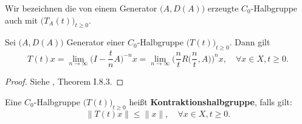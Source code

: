 \begin{verein}
Wir bezeichnen die  von einem Generator $\big(A, D(A)\big)$ erzeugte $C_0$-Halbgruppe auch mit $\big(T_A(t)\big)_{t\geq0}$.
\end{verein}


\begin{satz}\label{Darstellung einer Halbgruppe mithilfe der Resolvente}
Sei $\big(A, D(A)\big)$ Generator einer $C_0$-Halbgruppe  $\big(T(t)\big)_{t\geq0}$. Dann gilt
\begin{equation*}\label{Darstellung der Gruppe mithilfe der Resolvente}
T(t)x = \lim_{n\to\infty}\Big(I- \frac t n A\Big)^{-n}x = \lim_{n\to\infty} \Big(\frac n t R\Big(\frac n t, A\Big)\Big)^n x,\quad\forall x\in X, t\geq0.
\end{equation*}

\end{satz}

\begin{proof}
Siehe \cite{pazy_1983}, Theorem I.8.3.
\end{proof}

\begin{defi}
Eine $C_0$-Halbgruppe $\big(T(t)\big)_{t\geq0}$ heißt \textbf{Kontraktionshalbgruppe}, falls gilt:
\begin{equation*}
\|T(t)x\|\leq\|x\|,\quad \forall x\in X,  t\geq0.
\end{equation*}
\end{defi}



